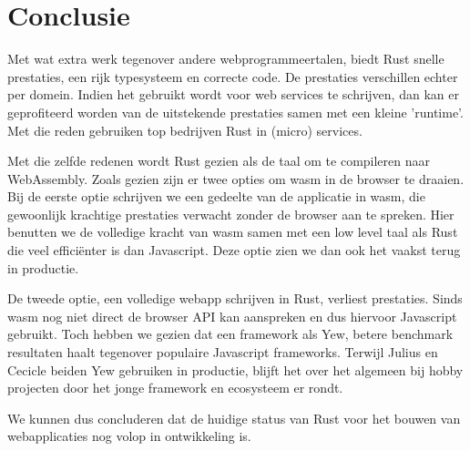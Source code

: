 \chapter{Conclusie}

Met wat extra werk tegenover andere webprogrammeertalen, biedt Rust snelle prestaties, een rijk
typesysteem en correcte code. De prestaties verschillen echter per domein. Indien het gebruikt wordt
voor web services te schrijven, dan kan er geprofiteerd worden van de uitstekende prestaties samen
met een kleine 'runtime'. Met die reden gebruiken top bedrijven Rust in (micro) services.

Met die zelfde redenen wordt Rust gezien als de taal om te compileren naar WebAssembly. Zoals gezien
zijn er twee opties om wasm in de browser te draaien. Bij de eerste optie schrijven we een gedeelte
van de applicatie in wasm, die gewoonlijk krachtige prestaties verwacht zonder de browser aan te
spreken. Hier benutten we de volledige kracht van wasm samen met een low level taal als Rust
die veel efficiënter is dan Javascript. Deze optie zien we dan ook het vaakst terug in productie.

De tweede optie, een volledige webapp schrijven in Rust, verliest prestaties. Sinds wasm nog niet
direct de browser API kan aanspreken en dus hiervoor Javascript gebruikt. Toch hebben we gezien dat
een framework als Yew, betere benchmark resultaten haalt tegenover populaire Javascript frameworks.
Terwijl Julius en Cecicle beiden Yew gebruiken in productie, blijft het over het algemeen bij hobby
projecten door het jonge framework en ecosysteem er rondt.

We kunnen dus concluderen dat de huidige status van Rust voor het bouwen van webapplicaties nog
volop in ontwikkeling is.
